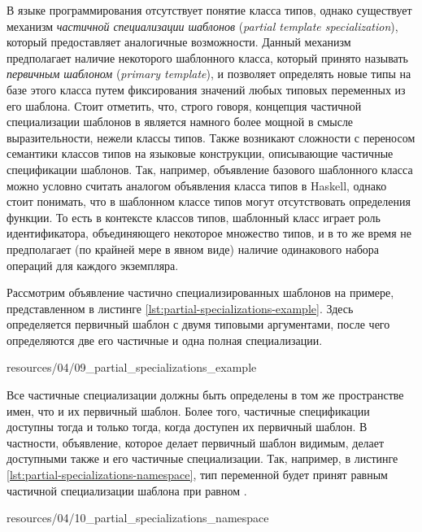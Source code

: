 В языке программирования \cpp отсутствует понятие класса типов, однако существует механизм \emph{частичной специализации шаблонов} (\emph{partial template specialization}), который предоставляет аналогичные возможности. Данный механизм предполагает наличие некоторого шаблонного класса, который принято называть \emph{первичным шаблоном} (\emph{primary template}), и позволяет определять новые типы на базе этого класса путем фиксирования значений любых типовых переменных из его шаблона. Стоит отметить, что, строго говоря, концепция частичной специализации шаблонов в \cpp является намного более мощной в смысле выразительности, нежели классы типов. Также возникают сложности с переносом семантики классов типов на языковые конструкции, описывающие частичные спецификации шаблонов. Так, например, объявление базового шаблонного класса можно условно считать аналогом объявления класса типов в Haskell, однако стоит понимать, что в шаблонном классе типов могут отсутствовать определения функции. То есть в контексте классов типов, шаблонный класс играет роль идентификатора, объединяющего некоторое множество типов, и в то же время не предполагает (по крайней мере в явном виде) наличие одинакового набора операций для каждого экземпляра. 

Рассмотрим объявление частично специализированных шаблонов на примере, представленном в листинге \ref{lst:partial-specializations-example}. Здесь определяется первичный шаблон  с двумя типовыми аргументами, после чего определяются две его частичные и одна полная специализации. 


{resources/04/09_partial_specializations_example}

Все частичные специализации должны быть определены в том же пространстве имен, что и их первичный шаблон. Более того, частичные спецификации доступны тогда и только тогда, когда доступен их первичный шаблон. В частности, объявление, которое делает первичный шаблон видимым, делает доступными также и его частичные специализации. Так, например, в листинге \ref{lst:partial-specializations-namespace}, тип переменной  будет принят равным частичной специализации шаблона  при  равном .


{resources/04/10_partial_specializations_namespace}

